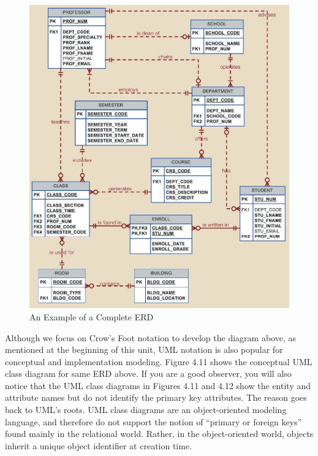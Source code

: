\documentclass[a4paper, 12pt, titlepage]{report}
\begin{document}
{\begin{figure}[H]
\includegraphics[scale=0.6]{ERDComp}
\caption{An Example of a Complete ERD}
\end{figure}
\noindent Although we focus on Crow’s Foot notation to develop the diagram above, as mentioned at the beginning of this unit, UML notation is also popular for conceptual and
implementation modeling. Figure 4.11 shows the conceptual UML class diagram for same ERD above. If you are a good observer, you will also notice that the UML class diagrams in Figures 4.11 and 4.12 show the entity and attribute names but do not identify the primary key attributes. The reason goes back to UML’s roots. UML class diagrams are an object-oriented modeling language, and therefore do not support the notion of “primary or foreign keys” found mainly in the relational world. Rather, in the object-oriented world, objects inherit a unique object identifier at creation time.
\begin{figure}[H]
\centering

\end{figure}}
\end{document}
